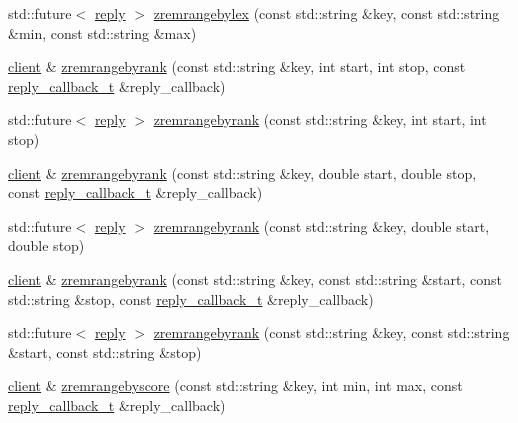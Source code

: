 \begin{DoxyCompactItemize}
\item 
std\+::future$<$ \hyperlink{classcpp__redis_1_1reply}{reply} $>$ \hyperlink{classcpp__redis_1_1client_a1350d0df45d5b41c940d782682b41bd9}{zremrangebylex} (const std\+::string \&key, const std\+::string \&min, const std\+::string \&max)
\item 
\hyperlink{classcpp__redis_1_1client}{client} \& \hyperlink{classcpp__redis_1_1client_af40c1e6895312c13636db9dd610ce753}{zremrangebyrank} (const std\+::string \&key, int start, int stop, const \hyperlink{classcpp__redis_1_1client_a061a1140d36d2eaeda82b09a0bb3f9f2}{reply\+\_\+callback\+\_\+t} \&reply\+\_\+callback)
\item 
std\+::future$<$ \hyperlink{classcpp__redis_1_1reply}{reply} $>$ \hyperlink{classcpp__redis_1_1client_acc4f3b77c38c948658505ce04bbbde6d}{zremrangebyrank} (const std\+::string \&key, int start, int stop)
\item 
\hyperlink{classcpp__redis_1_1client}{client} \& \hyperlink{classcpp__redis_1_1client_a727a7eeae900fc82525544618deaa70b}{zremrangebyrank} (const std\+::string \&key, double start, double stop, const \hyperlink{classcpp__redis_1_1client_a061a1140d36d2eaeda82b09a0bb3f9f2}{reply\+\_\+callback\+\_\+t} \&reply\+\_\+callback)
\item 
std\+::future$<$ \hyperlink{classcpp__redis_1_1reply}{reply} $>$ \hyperlink{classcpp__redis_1_1client_a7ad8503cfe002efb2caa36a09791125f}{zremrangebyrank} (const std\+::string \&key, double start, double stop)
\item 
\hyperlink{classcpp__redis_1_1client}{client} \& \hyperlink{classcpp__redis_1_1client_aafca4e3ca703fff85b1b6a1c9476c958}{zremrangebyrank} (const std\+::string \&key, const std\+::string \&start, const std\+::string \&stop, const \hyperlink{classcpp__redis_1_1client_a061a1140d36d2eaeda82b09a0bb3f9f2}{reply\+\_\+callback\+\_\+t} \&reply\+\_\+callback)
\item 
std\+::future$<$ \hyperlink{classcpp__redis_1_1reply}{reply} $>$ \hyperlink{classcpp__redis_1_1client_a2215c127cf351c43b69f62d871e7acb7}{zremrangebyrank} (const std\+::string \&key, const std\+::string \&start, const std\+::string \&stop)
\item 
\hyperlink{classcpp__redis_1_1client}{client} \& \hyperlink{classcpp__redis_1_1client_a8de95c0d340cc58d81fe5ca9b576d5b8}{zremrangebyscore} (const std\+::string \&key, int min, int max, const \hyperlink{classcpp__redis_1_1client_a061a1140d36d2eaeda82b09a0bb3f9f2}{reply\+\_\+callback\+\_\+t} \&reply\+\_\+callback)
\item 

\end{DoxyCompactItemize}
